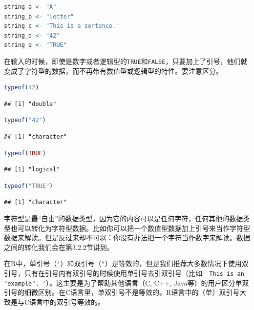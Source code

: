 \documentclass[]{ctexbook}
\newcommand{\passthrough}[1]{#1}
\begin{document}
\begin{lstlisting}[language=R]
string_a <- "A"
string_b <- "letter"
string_c <- "This is a sentence."
string_d <- "42"
string_e <- "TRUE"
\end{lstlisting}

在输入的时候，即使是数字或者逻辑型的\passthrough{\lstinline!TRUE!}和\passthrough{\lstinline!FALSE!}，只要加上了引号，他们就变成了字符型的数据，而不再带有数值型或逻辑型的特性。要注意区分。

\begin{lstlisting}[language=R]
typeof(42)
\end{lstlisting}

\begin{lstlisting}
## [1] "double"
\end{lstlisting}

\begin{lstlisting}[language=R]
typeof("42")
\end{lstlisting}

\begin{lstlisting}
## [1] "character"
\end{lstlisting}

\begin{lstlisting}[language=R]
typeof(TRUE)
\end{lstlisting}

\begin{lstlisting}
## [1] "logical"
\end{lstlisting}

\begin{lstlisting}[language=R]
typeof("TRUE")
\end{lstlisting}

\begin{lstlisting}
## [1] "character"
\end{lstlisting}

字符型是最``自由''的数据类型，因为它的内容可以是任何字符，任何其他的数据类型也可以转化为字符型数据。比如你可以把一个数值型数据加上引号来当作字符型数据来解读。但是反过来却不可以：你没有办法把一个字符当作数字来解读。数据之间的转化我们会在第3.2.2节讲到。

在R中，单引号（\passthrough{\lstinline!'!}）和双引号（\passthrough{\lstinline!"!}）是等效的，但是我们推荐大多数情况下使用双引号，只有在引号内有双引号的时候使用单引号去引双引号（比如\passthrough{\lstinline!' This is an "example". '!}）。这主要是为了帮助其他语言（C, C++, Java等）的用户区分单双引号的细微区别。在C语言里，单双引号不是等效的。R语言中的（单）双引号大致是与C语言中的双引号等效的。
\end{document}
